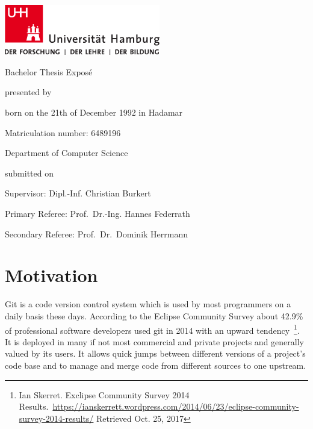 \begin{titlepage}
    \includegraphics[width=6.8cm]{./pic/up-uhh-logo-u-2010-u-farbe-u-rgb.pdf}
    \begin{center}\Large
        \vfill
        Bachelor Thesis Exposé
        \vfill

        \makeatletter
        {\Large\textsf{\textbf{\@title}}\par}
        \makeatother

        \vfill
        presented by
        \par\bigskip

        \makeatletter
        {\@author} \par
        \makeatother

        born on the 21th of December 1992 in Hadamar \par
        Matriculation number: 6489196 \par
        Department of Computer Science
        \vfill

        \makeatletter
        submitted on {\@date}
        \makeatother

        \vfill
        Supervisor: Dipl.-Inf. Christian Burkert \par
        Primary Referee: Prof.\ Dr.-Ing. Hannes Federrath \par
        Secondary Referee:  Prof.\ Dr.\ Dominik Herrmann

    \end{center}
\end{titlepage}

{\small \tableofcontents}

\chapter{Motivation}
Git is a code version control system which is used by most programmers on a daily basis these days. According to the Eclipse Community Survey about 42.9\% of professional software developers used git in 2014 with an upward tendency~\footnote{Ian Skerret. Exclipse Community Survey 2014 Results.\ \url{https://ianskerrett.wordpress.com/2014/06/23/eclipse-community-survey-2014-results/} Retrieved Oct. 25, 2017}.
It is deployed in many if not most commercial and private projects and generally valued by its users. It allows quick jumps between different versions of a project's code base and to manage and merge code from different sources to one upstream.


